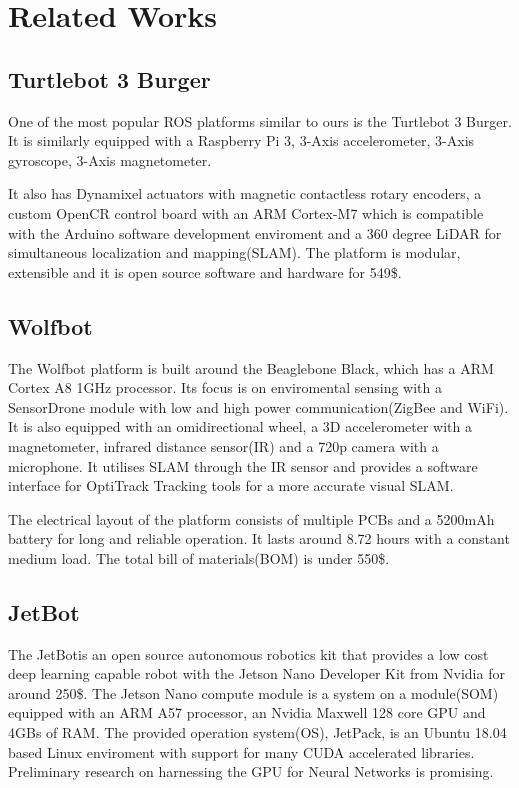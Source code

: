 \documentclass[class=article, crop=false]{standalone}
\begin{document}
\chapter{Related Works}\label{cha:related-works}

\section{Turtlebot 3 Burger}\label{sec:turtlebot3burger}
One of the most popular ROS platforms similar to ours is the Turtlebot 3 Burger\footnotemark. It is similarly equipped with a Raspberry Pi 3, 3-Axis accelerometer, 3-Axis gyroscope, 3-Axis magnetometer.

It also has Dynamixel actuators with magnetic contactless rotary encoders, a custom OpenCR control board with an ARM Cortex-M7 which is compatible with the Arduino software development enviroment and a 360 degree LiDAR for simultaneous localization and mapping(SLAM).
The platform is modular, extensible and it is open source software and hardware for 549\$\cite{turtlebot3}.


\section{Wolfbot}\label{sec:wolfbot}
The Wolfbot\cite{wolfbot} platform is built around the Beaglebone Black, which has a ARM Cortex A8 1GHz processor. Its focus is on enviromental sensing with a SensorDrone module with low and high power communication(ZigBee and WiFi). It is also equipped with an omidirectional wheel, a 3D accelerometer with a magnetometer, infrared distance sensor(IR) and a 720p camera with a microphone. It utilises SLAM through the IR sensor and provides a software interface for OptiTrack Tracking tools for a more accurate visual SLAM.

The electrical layout of the platform consists of multiple PCBs and a 5200mAh battery for long and reliable operation. It lasts around 8.72 hours with a constant medium load. The total bill of materials(BOM) is under 550\$.

\section{JetBot}\label{sec:jetbot}
The JetBot\footnotemark is an open source autonomous robotics kit that provides a low cost deep learning capable robot with the Jetson Nano Developer Kit from Nvidia for around 250\$.
\indent
The Jetson Nano compute module is a system on a module(SOM) equipped with an ARM A57 processor, an Nvidia Maxwell 128 core GPU and 4GBs of RAM. The provided operation system(OS), JetPack, is an Ubuntu 18.04 based Linux enviroment with support for many CUDA accelerated libraries. Preliminary research on harnessing the GPU for Neural Networks is promising\cite{hubbard2019}.
\end{document}
